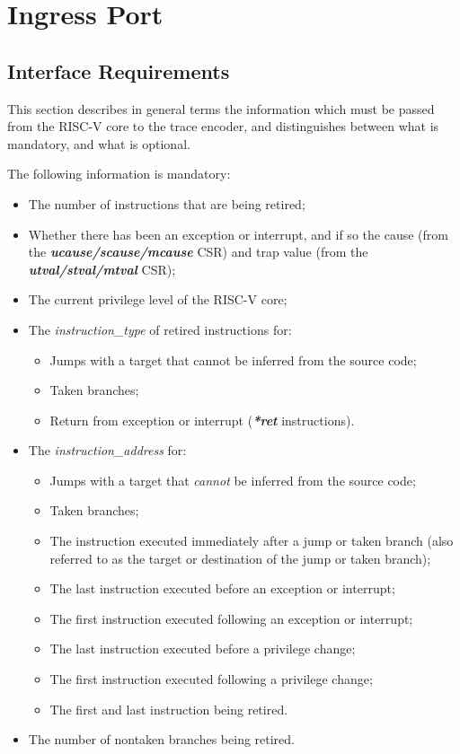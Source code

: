 \chapter{Ingress Port} \label{Interface}

\section{Interface Requirements}
This section describes in general terms the information which must be passed from the RISC-V core to the trace encoder,
and distinguishes between what is mandatory, and what is optional.

The following information is mandatory:

\begin{itemize}
  \item The number of instructions that are being retired;
  \item Whether there has been an exception or interrupt, and if so the cause (from the \textbf{\textit{ucause/scause/mcause}} CSR)
        and trap value (from the \textbf{\textit{utval/stval/mtval}} CSR);
  \item The current privilege level of the RISC-V core;
  \item The \textit{instruction\_type} of retired instructions for:
    \begin{itemize}
      \item Jumps with a target that cannot be inferred from the source code;
      \item Taken branches;
      \item Return from exception or interrupt (\textbf{\textit{*ret}} instructions).
    \end{itemize}
  \item The \textit{instruction\_address} for:
    \begin{itemize}
      \item Jumps with a target that \textit{cannot} be inferred from the source code;
      \item Taken branches;
      \item The instruction executed immediately after a jump or taken branch (also referred to as the target or destination of the jump or taken branch);
      \item The last instruction executed before an exception or interrupt;
      \item The first instruction executed following an exception or interrupt;
      \item The last instruction executed before a privilege change;
      \item The first instruction executed following a privilege change;
      \item The first and last instruction being retired.
    \end{itemize}
  \item The number of nontaken branches being retired.
\end{itemize}

